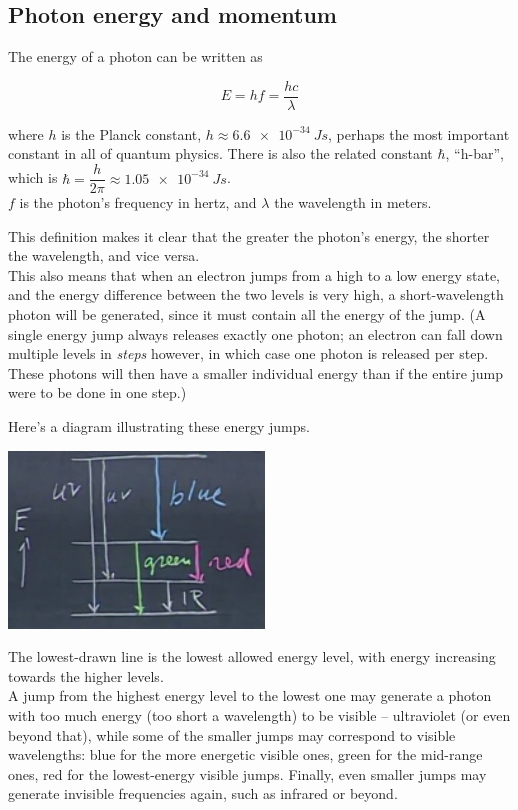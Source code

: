 \documentclass[8.01x]{subfiles}
\begin{document}
\subsection{Photon energy and momentum}

The energy of a photon can be written as

\begin{equation}
E = h f = \frac{h c}{\lambda}
\end{equation}

where $h$ is the Planck constant, $h \approx \SI{6.6e-34}{J s}$, perhaps the most important constant in all of quantum physics. There is also the related constant $\hbar$, ``h-bar'', which is $\hbar = \dfrac{h}{2\pi} \approx \SI{1.05e-34}{J s}$.\\
$f$ is the photon's frequency in hertz, and $\lambda$ the wavelength in meters.

This definition makes it clear that the greater the photon's energy, the shorter the wavelength, and vice versa.\\
This also means that when an electron jumps from a high to a low energy state, and the energy difference between the two levels is very high, a short-wavelength photon will be generated, since it must contain all the energy of the jump. (A single energy jump always releases exactly one photon; an electron can fall down multiple levels in \emph{steps} however, in which case one photon is released per step. These photons will then have a smaller individual energy than if the entire jump were to be done in one step.)

Here's a diagram illustrating these energy jumps.

\begin{center}
\includegraphics[scale=0.65]{Graphics/lec34_energy_levels}
\end{center}

The lowest-drawn line is the lowest allowed energy level, with energy increasing towards the higher levels.\\
A jump from the highest energy level to the lowest one may generate a photon with too much energy (too short a wavelength) to be visible -- ultraviolet (or even beyond that), while some of the smaller jumps may correspond to visible wavelengths: blue for the more energetic visible ones, green for the mid-range ones, red for the lowest-energy visible jumps. Finally, even smaller jumps may generate invisible frequencies again, such as infrared or beyond.
\end{document}
